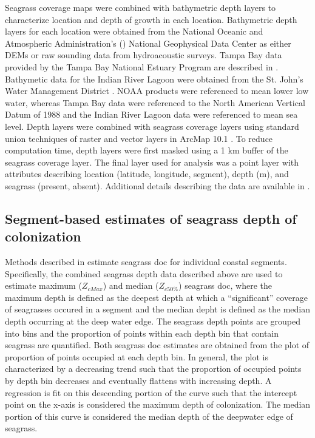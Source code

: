 \documentclass[letterpaper,12pt,oneside]{article}\usepackage[]{graphicx}\usepackage[]{color}
\begin{document}
Seagrass coverage maps were combined with bathymetric depth layers to characterize location and depth of growth in each location.  Bathymetric depth layers for each location were obtained from the National Oceanic and Atmospheric Administration's () National Geophysical Data Center as either \acp{DEM} or raw sounding data from hydroacoustic surveys.  Tampa Bay data provided by the Tampa Bay National Estuary Program are described in \citet{Tyler07}. Bathymetic data for the Indian River Lagoon were obtained from the St. John's Water Management District \citep{CPE97}.  \ac{NOAA} products were referenced to mean lower low water, whereas Tampa Bay data were referenced to the North American Vertical Datum of 1988 and the Indian River Lagoon data were referenced to mean sea level.  Depth layers were combined with seagrass coverage layers using standard union techniques of raster and vector layers in ArcMap 10.1 \citep{ESRI12}.  To reduce computation time, depth layers were first masked using a 1 km buffer of the seagrass coverage layer.  The final layer used for analysis was a point layer with attributes describing location (latitude, longitude, segment), depth (m), and seagrass (present, absent).  Additional details describing the data are available in \citet{HagyIR}.    

\subsection{Segment-based estimates of seagrass depth of colonization}

Methods described in \citet{HagyIR} estimate seagrass \ac{doc} for individual coastal segments.  Specifically, the combined seagrass depth data described above are used to estimate maximum ($Z_{cMax}$) and median ($Z_{c50\%}$) seagrass \ac{doc}, where the maximum depth is defined as the deepest depth at which a ``significant'' coverage of seagrasses occured in a segment and the median depht is defined as the median depth occurring at the deep water edge. The seagrass depth points are grouped into bins and the proportion of points within each depth bin that contain seagrass are quantified.  Both seagrass \ac{doc} estimates are obtained from the plot of proportion of points occupied at each depth bin.  In general, the plot is characterized by a decreasing trend such that the proportion of occupied points by depth bin decreases and eventually flattens with increasing depth.  A regression is fit on this descending portion of the curve such that the intercept point on the x-axis is considered the maximum depth of colonization.  The median portion of this curve is considered the median depth of the deepwater edge of seagrass.   
\end{document}
